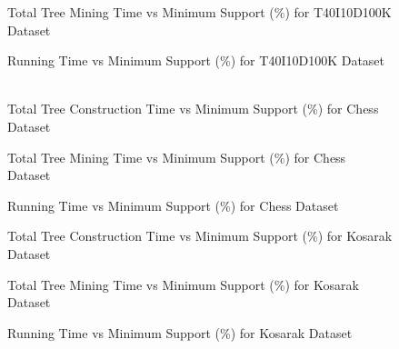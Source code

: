 			\begin{figure}[h]
			\centering
				
			\caption{Total Tree Mining Time vs Minimum Support (\%) for T40I10D100K Dataset ~\cite{dataset}}
			\label{result:g_t10_mining_total}
			\end{figure}
			
			\begin{figure}[h]
			\centering
				
			\caption{Running Time vs Minimum Support (\%) for T40I10D100K Dataset ~\cite{dataset}}
			\label{result:g_t10_total}
			\end{figure}
	
			\begin{figure}[h]
			\centering
				
			\caption{Total Tree Construction Time vs Minimum Support (\%) for Chess Dataset ~\cite{dataset}}
			\label{result:g_chess_tree_construction_total}
			\end{figure}
			
			\begin{figure}[h]
			\centering
				
			\caption{Total Tree Mining Time vs Minimum Support (\%) for Chess Dataset ~\cite{dataset}}
			\label{result:g_chess_mining_total}
			\end{figure}
			
			\begin{figure}[h]
			\centering
				
			\caption{Running Time vs Minimum Support (\%) for Chess Dataset ~\cite{dataset}}
			\label{result:g_chess_total}
			\end{figure}
			\begin{figure}[h]
			\centering
				
			\caption{Total Tree Construction Time vs Minimum Support (\%) for Kosarak Dataset ~\cite{dataset}}
			\label{result:g_k_tree_construction_total}
			\end{figure}
			
			\begin{figure}[h]
			\centering
				
			\caption{Total Tree Mining Time vs Minimum Support (\%) for Kosarak Dataset ~\cite{dataset}}
			\label{result:g_k_mining_total}
			\end{figure}
			\begin{figure}[h]
			\centering
				
			\caption{Running Time vs Minimum Support (\%) for Kosarak Dataset ~\cite{dataset}}
			\label{result:g_k_total}
			\end{figure}
			

